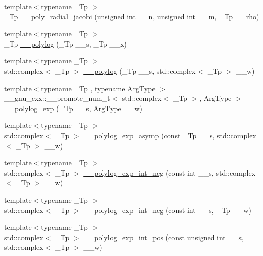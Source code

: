 \begin{DoxyCompactItemize}
{\footnotesize template$<$typename \+\_\+\+Tp $>$ }\\\+\_\+\+Tp \hyperlink{namespacestd_1_1____detail_af325d47042bc9661bbde61b13f368fec}{\+\_\+\+\_\+poly\+\_\+radial\+\_\+jacobi} (unsigned int \+\_\+\+\_\+n, unsigned int \+\_\+\+\_\+m, \+\_\+\+Tp \+\_\+\+\_\+rho)
\item 
{\footnotesize template$<$typename \+\_\+\+Tp $>$ }\\\+\_\+\+Tp \hyperlink{namespacestd_1_1____detail_a17fb8cea11706f319aaea277188a29c8}{\+\_\+\+\_\+polylog} (\+\_\+\+Tp \+\_\+\+\_\+s, \+\_\+\+Tp \+\_\+\+\_\+x)
\item 
{\footnotesize template$<$typename \+\_\+\+Tp $>$ }\\std\+::complex$<$ \+\_\+\+Tp $>$ \hyperlink{namespacestd_1_1____detail_aa14e3ca6e4bee5ac1f1e5e1c2cee1d5a}{\+\_\+\+\_\+polylog} (\+\_\+\+Tp \+\_\+\+\_\+s, std\+::complex$<$ \+\_\+\+Tp $>$ \+\_\+\+\_\+w)
\item 
{\footnotesize template$<$typename \+\_\+\+Tp , typename Arg\+Type $>$ }\\\+\_\+\+\_\+gnu\+\_\+cxx\+::\+\_\+\+\_\+promote\+\_\+num\+\_\+t$<$ std\+::complex$<$ \+\_\+\+Tp $>$, Arg\+Type $>$ \hyperlink{namespacestd_1_1____detail_ad01c033a96c9f185216d6c9f9db49c99}{\+\_\+\+\_\+polylog\+\_\+exp} (\+\_\+\+Tp \+\_\+\+\_\+s, Arg\+Type \+\_\+\+\_\+w)
\item 
{\footnotesize template$<$typename \+\_\+\+Tp $>$ }\\std\+::complex$<$ \+\_\+\+Tp $>$ \hyperlink{namespacestd_1_1____detail_a84b83a6be0a236fbcbbdea9078e8ca58}{\+\_\+\+\_\+polylog\+\_\+exp\+\_\+asymp} (const \+\_\+\+Tp \+\_\+\+\_\+s, std\+::complex$<$ \+\_\+\+Tp $>$ \+\_\+\+\_\+w)
\item 
{\footnotesize template$<$typename \+\_\+\+Tp $>$ }\\std\+::complex$<$ \+\_\+\+Tp $>$ \hyperlink{namespacestd_1_1____detail_af7e0c042cba3c3ffc60844b1e0d545a6}{\+\_\+\+\_\+polylog\+\_\+exp\+\_\+int\+\_\+neg} (const int \+\_\+\+\_\+s, std\+::complex$<$ \+\_\+\+Tp $>$ \+\_\+\+\_\+w)
\item 
{\footnotesize template$<$typename \+\_\+\+Tp $>$ }\\std\+::complex$<$ \+\_\+\+Tp $>$ \hyperlink{namespacestd_1_1____detail_a7d1d29f2a53007e83c70e9ef805d0ffa}{\+\_\+\+\_\+polylog\+\_\+exp\+\_\+int\+\_\+neg} (const int \+\_\+\+\_\+s, \+\_\+\+Tp \+\_\+\+\_\+w)
\item 
{\footnotesize template$<$typename \+\_\+\+Tp $>$ }\\std\+::complex$<$ \+\_\+\+Tp $>$ \hyperlink{namespacestd_1_1____detail_a28317fd26d839f4e1cea72be3418508e}{\+\_\+\+\_\+polylog\+\_\+exp\+\_\+int\+\_\+pos} (const unsigned int \+\_\+\+\_\+s, std\+::complex$<$ \+\_\+\+Tp $>$ \+\_\+\+\_\+w)

\end{DoxyCompactItemize}
